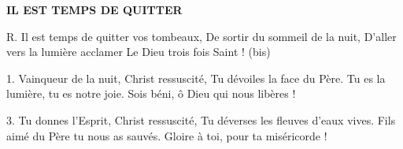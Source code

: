 \textbf{IL EST TEMPS DE QUITTER}

R. Il est temps de quitter vos tombeaux,
De sortir du sommeil de la nuit,
D’aller vers la lumière acclamer
Le Dieu trois fois Saint ! (bis)

1. Vainqueur de la nuit, Christ ressuscité,
Tu dévoiles la face du Père.
Tu es la lumière, tu es notre joie.
Sois béni, ô Dieu qui nous libères !

3. Tu donnes l’Esprit, Christ ressuscité, 
Tu déverses les fleuves d’eaux vives.
Fils aimé du Père tu nous as sauvés.
Gloire à toi, pour ta miséricorde !
